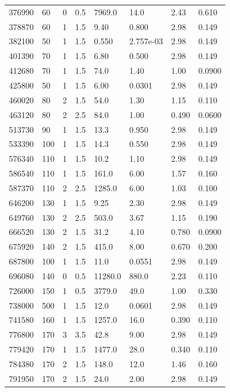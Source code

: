 \documentclass[preview]{standalone}
\begin{document}
{{\begin{tabular}{L{1.2cm}C{1.2cm} C{0.3cm}C{0.5cm} C{1.4cm}C{1.4cm} C{1.4cm}C{1.4cm}}
  376990  &    60  & 0     & 0.5 &  7969.0  & 14.0  & 2.43 &  0.610   \\ 
  378870  &    60  & 1     & 1.5 &  9.40  & 0.800  & 2.98 &  0.149   \\ 
  382100  &    50  & 1     & 1.5 &  0.550  & 2.757e-03  & 2.98 &  0.149   \\ 
  401390  &    70  & 1     & 1.5 &  6.80  & 0.500  & 2.98 &  0.149   \\ 
  412680  &    70  & 1     & 1.5 &  74.0  & 1.40  & 1.00 &  0.0900   \\ 
  425800  &    50  & 1     & 1.5 &  6.00  & 0.0301  & 2.98 &  0.149   \\ 
  460020  &    80  & 2     & 1.5 &  54.0  & 1.30  & 1.15 &  0.110   \\ 
  463120  &    80  & 2     & 2.5 &  84.0  & 1.00  & 0.490 &  0.0600   \\ 
  513730  &    90  & 1     & 1.5 &  13.3  & 0.950  & 2.98 &  0.149   \\ 
  533390  &   100  & 1     & 1.5 &  14.3  & 0.550  & 2.98 &  0.149   \\ 
  576340  &   110  & 1     & 1.5 &  10.2  & 1.10  & 2.98 &  0.149   \\ 
  586540  &   110  & 1     & 1.5 &  161.0  & 6.00  & 1.57 &  0.160   \\ 
  587370  &   110  & 2     & 2.5 &  1285.0  & 6.00  & 1.03 &  0.100   \\ 
  646200  &   130  & 1     & 1.5 &  9.25  & 2.30  & 2.98 &  0.149   \\ 
  649760  &   130  & 2     & 2.5 &  503.0  & 3.67  & 1.15 &  0.190   \\ 
  666520  &   130  & 2     & 1.5 &  31.2  & 4.10  & 0.780 &  0.0900   \\ 
  675920  &   140  & 2     & 1.5 &  415.0  & 8.00  & 0.670 &  0.200   \\ 
  687800  &   100  & 1     & 1.5 &  11.0  & 0.0551  & 2.98 &  0.149   \\ 
  696080  &   140  & 0     & 0.5 &  11280.0  & 880.0  & 2.23 &  0.110   \\ 
  726000  &   150  & 1     & 0.5 &  3779.0  & 49.0  & 1.00 &  0.330   \\ 
  738000  &   500  & 1     & 1.5 &  12.0  & 0.0601  & 2.98 &  0.149   \\ 
  741580  &   160  & 1     & 1.5 &  1257.0  & 16.0  & 0.390 &  0.110   \\ 
  776800  &   170  & 3     & 3.5 &  42.8  & 9.00  & 2.98 &  0.149   \\ 
  779420  &   170  & 1     & 1.5 &  1477.0  & 28.0  & 0.340 &  0.110   \\ 
  784380  &   170  & 2     & 1.5 &  148.0  & 12.0  & 1.46 &  0.160   \\ 
  791950  &   170  & 2     & 1.5 &  24.0  & 2.00  & 2.98 &  0.149   \\ 
\hline 
\end{tabular} 

}}
\end{document}
